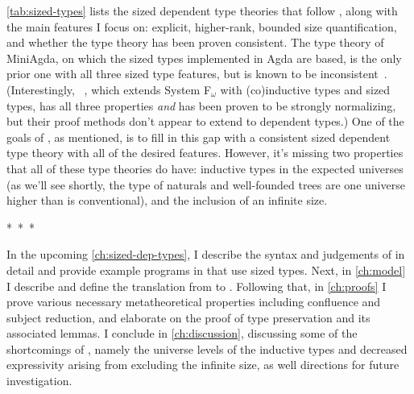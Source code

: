 \cref{tab:sized-types} lists the sized dependent type theories that follow \CIChat,
along with the main features I focus on:
explicit, higher-rank, bounded size quantification,
and whether the type theory has been proven consistent.
The type theory of MiniAgda, on which the sized types implemented in Agda are based,
is the only prior one with all three sized type features,
but is known to be inconsistent~\citep{infinity}.
(Interestingly, \Fcopomega~\citep{F-omega-cop}, which extends System F$_\omega$ with (co)inductive types and sized types,
has all three properties \emph{and} has been proven to be strongly normalizing,
but their proof methods don't appear to extend to dependent types.)
One of the goals of \lang, as mentioned, is to fill in this gap
with a consistent sized dependent type theory with all of the desired features.
However, it's missing two properties that all of these type theories do have:
inductive types in the expected universes
(as we'll see shortly, the type of naturals and well-founded trees
are one universe higher than is conventional),
and the inclusion of an infinite size.


\begin{center}
\mbox{* * *}
\end{center}
\vspace*{-0.5\baselineskip}

\noindent In the upcoming \cref{ch:sized-dep-types}, I describe the syntax and judgements of \lang in detail
and provide example programs in \lang that use sized types.
Next, in \cref{ch:model} I describe \CICE and define the translation from \lang to \CICE.
Following that, in \cref{ch:proofs} I prove various necessary metatheoretical properties
including confluence and subject reduction,
and elaborate on the proof of type preservation and its associated lemmas.
I conclude in \cref{ch:discussion}, discussing some of the shortcomings of \lang,
namely the universe levels of the inductive types and
decreased expressivity arising from excluding the infinite size,
as well directions for future investigation.